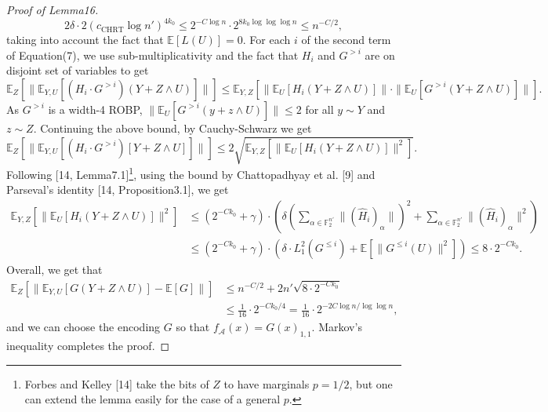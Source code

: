 \documentclass[10pt,a4paper]{article}
\begin{document}
\begin{proof}[Proof of Lemma16]
\[
2\delta\cdot2(c_{\mathrm{CHRT}}\log n')^{4k_0}
\le2^{-C\log n}\cdot2^{8k_0\log\log\log n}\le n^{-C/2},
\]
taking into account the fact that $\mathbb E[L(U)]=0$.
For each $i$ of the second term of Equation(7), we use sub-multiplicativity and the fact that $H_i$ and $G^{>i}$ are on disjoint set of variables to get
\[
\mathbb E_Z[\|\mathbb E_{Y,U}[(H_i\cdot G^{>i})(Y+Z\wedge U)]\|]
\le\mathbb E_{Y,Z}[\|\mathbb E_U[H_i(Y+Z\wedge U)]\|\cdot\|\mathbb E_U[G^{>i}(Y+Z\wedge U)]\|].
\]
As $G^{>i}$ is a width-4 ROBP, $\|\mathbb E_U[G^{>i}(y+z\wedge U)]\|\le2$ for all $y\sim Y$ and $z\sim Z$. Continuing the above bound, by Cauchy-Schwarz we get
\[
\mathbb E_Z[\|\mathbb E_{Y,U}[(H_i\cdot G^{>i})[Y+Z\wedge U]]\|]
\le2\sqrt{\mathbb E_{Y,Z}[\|\mathbb E_U[H_i(Y+Z\wedge U)]\|^2]}.
\]
Following [14, Lemma7.1]\footnote{Forbes and Kelley [14] take the bits of $Z$ to have marginals $p=1/2$, but one can extend the lemma easily for the case of a general $p$.}, using the bound by Chattopadhyay et al. [9] and Parseval's identity [14, Proposition3.1], we get
\begin{align*}
\mathbb E_{Y,Z}[\|\mathbb E_U[H_i(Y+Z\wedge U)]\|^2]
&\le(2^{-Ck_0}+\gamma)\cdot\left(\delta\left(\sum_{\alpha\in\mathbb F_2^{n'}}\|(\widehat H_i)_\alpha\|\right)^2+\sum_{\alpha\in\mathbb F_2^{n'}}\|(\widehat H_i)_\alpha\|^2\right)\\
&\le(2^{-Ck_0}+\gamma)\cdot\left(\delta\cdot L_1^2(G^{\le i})+\mathbb E[\|G^{\le i}(U)\|^2]\right)
\le8\cdot2^{-Ck_0}.
\end{align*}
Overall, we get that
\begin{align*}
\mathbb E_Z[\|\mathbb E_{Y,U}[G(Y+Z\wedge U)]-\mathbb E[G]\|]
&\le n^{-C/2}+2n'\sqrt{8\cdot2^{-Ck_0}}\\
&\le\frac1{16}\cdot2^{-Ck_0/4}
=\frac1{16}\cdot2^{-2C\log n/\log\log n},
\end{align*}
and we can choose the encoding $G$ so that $f_{\mathcal A}(x)=G(x)_{1,1}$. Markov's inequality completes the proof.
\end{proof}
\end{document}

